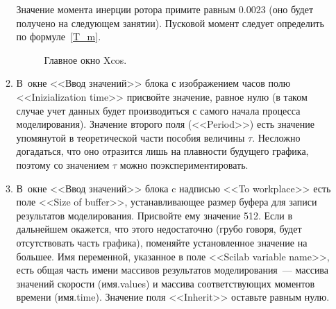 \documentclass[12pt,a4paper,openany]{extarticle}
\begin{document}
\begin{enumerate}
\begin{enumerate}
Значение момента инерции ротора примите равным $0.0023$ (оно будет получено на следующем занятии).
Пусковой момент следует определить по формуле~\eqref{T_m}. 

\begin{figure}[h]
	\noindent{}
	\caption{Главное окно Xcos.}
	\label{xcos_window}
\end{figure}
\item В~окне <<Ввод значений>> блока с изображением часов полю <<Inizialization time>>  присвойте значение, равное нулю (в таком случае учет данных будет производиться с самого начала процесса моделирования). 
Значение второго поля (<<Period>>) есть значение упомянутой в теоретической части пособия величины $\tau$\!.
Несложно догадаться, что оно отразится лишь на плавности будущего графика, поэтому со значением $\tau$ можно поэкспериментировать.
\item \label{name} В~окне <<Ввод значений>> блока c надписью <<To workplace>> есть поле  <<Size of buffer>>, устанавливающее размер буфера для записи результатов моделирования. 
Присвойте ему значение 512. Если в дальнейшем окажется, что этого недостаточно (грубо говоря, будет отсутствовать часть графика), поменяйте установленное значение на большее. 
Имя переменной, указанное в поле <<Scilab variable name>>, есть общая часть имени массивов результатов моделирования~--- массива значений скорости (имя.values) и массива соответствующих моментов времени (имя.time). 
Значение поля <<Inherit>> оставьте равным нулю.


\end{enumerate}
\end{enumerate}
\end{document}
